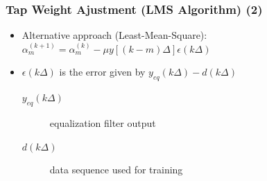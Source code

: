 \documentclass{beamer}
\begin{document}
\begin{frame}
	\frametitle{Tap Weight Ajustment (LMS Algorithm) (2)}
	\begin{itemize}
		\item Alternative approach (Least-Mean-Square): $ \alpha^{(k+1)}_m = \alpha^{(k)}_m - \mu y[(k - m)\Delta] \epsilon(k\Delta) $
		\item $ \epsilon(k\Delta) $ is the error given by $ y_{eq}(k\Delta) - d(k\Delta) $
		\begin{description}
			\item[$ y_{eq}(k\Delta) $] equalization filter output
			\item[$ d(k\Delta) $] data sequence used for training
		\end{description}
	\end{itemize}
\end{frame}
\end{document}
